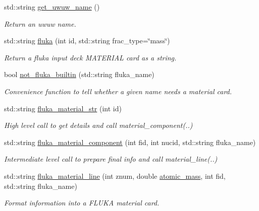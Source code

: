 \begin{DoxyCompactItemize}
std\+::string \hyperlink{classpyne_1_1_material_a2b380eb9f0db68d6bd56948cd297ab60}{get\+\_\+uwuw\+\_\+name} ()
\begin{DoxyCompactList}\small\item\em Return an uwuw name. \end{DoxyCompactList}\item 
std\+::string \hyperlink{classpyne_1_1_material_a6bcd10072abbf3e9a8bcaa466f8be569}{fluka} (int id, std\+::string frac\+\_\+type=\char`\"{}mass\char`\"{})
\begin{DoxyCompactList}\small\item\em Return a fluka input deck M\+A\+T\+E\+R\+I\+AL card as a string. \end{DoxyCompactList}\item 
bool \hyperlink{classpyne_1_1_material_a97461e1c6a87d91ed1293adbe43cb29e}{not\+\_\+fluka\+\_\+builtin} (std\+::string fluka\+\_\+name)
\begin{DoxyCompactList}\small\item\em Convenience function to tell whether a given name needs a material card. \end{DoxyCompactList}\item 
std\+::string \hyperlink{classpyne_1_1_material_af3f7e0865a7a8019e02c2fb3c408c2f3}{fluka\+\_\+material\+\_\+str} (int id)
\begin{DoxyCompactList}\small\item\em High level call to get details and call material\+\_\+component(..) \end{DoxyCompactList}\item 
std\+::string \hyperlink{classpyne_1_1_material_a3b7bc2f7ca3f2c05860004ea27ebcadb}{fluka\+\_\+material\+\_\+component} (int fid, int nucid, std\+::string fluka\+\_\+name)
\begin{DoxyCompactList}\small\item\em Intermediate level call to prepare final info and call material\+\_\+line(..) \end{DoxyCompactList}\item 
std\+::string \hyperlink{classpyne_1_1_material_a269b13dac00eb3ba0ff31feb5bd3b0ca}{fluka\+\_\+material\+\_\+line} (int znum, double \hyperlink{namespacepyne_aaab79c2417fc60c1a248dd702403befb}{atomic\+\_\+mass}, int fid, std\+::string fluka\+\_\+name)
\begin{DoxyCompactList}\small\item\em Format information into a F\+L\+U\+KA material card. \end{DoxyCompactList}\item 

\end{DoxyCompactItemize}
